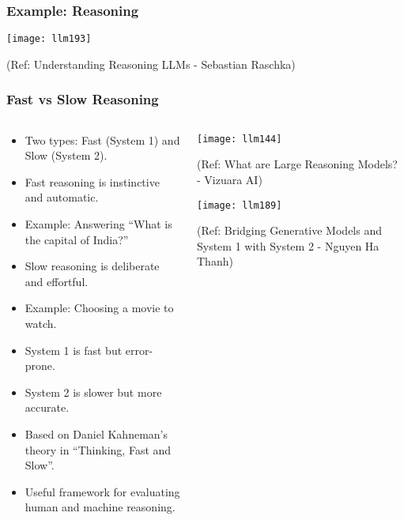 \begin{frame}[fragile]\frametitle{Example: Reasoning}

		\begin{center}
		\texttt{[image: llm193]}
		
		{\tiny (Ref: Understanding Reasoning LLMs - Sebastian Raschka)}
		
		\end{center}
\end{frame}


\begin{frame}[fragile]\frametitle{Fast vs Slow Reasoning}

\begin{columns}
    \begin{column}[T]{0.6\linewidth}
		\begin{itemize}
		  \item Two types: Fast (System 1) and Slow (System 2).
		  \item Fast reasoning is instinctive and automatic.
		  \item Example: Answering ``What is the capital of India?''
		  \item Slow reasoning is deliberate and effortful.
		  \item Example: Choosing a movie to watch.
		  \item System 1 is fast but error-prone.
		  \item System 2 is slower but more accurate.
		  \item Based on Daniel Kahneman's theory in ``Thinking, Fast and Slow''.
		  \item Useful framework for evaluating human and machine reasoning.
		\end{itemize}

    \end{column}
    \begin{column}[T]{0.4\linewidth}
		\begin{center}
		\texttt{[image: llm144]}
		
		{\tiny (Ref: What are Large Reasoning Models? - Vizuara AI)}
		
		\texttt{[image: llm189]}
		
		{\tiny (Ref: Bridging Generative Models and System 1 with System 2 - Nguyen Ha Thanh)}
		
		\end{center}
    \end{column}
  \end{columns}
 
\end{frame}



